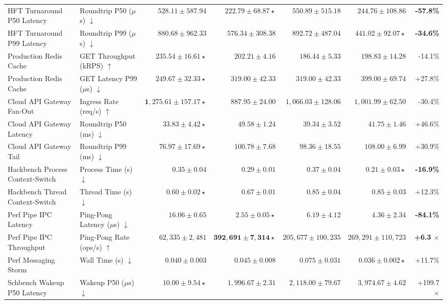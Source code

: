 \documentclass[conference]{IEEEtran}
\begin{document}
\begin{table}[t!]
{\begin{tabular}{llrrrrr}
HFT Turnaround P50 Latency & Roundtrip P50 ($\mu$s) $\downarrow$ & $528.11 \pm 587.94$ & $\mathbf{222.79 \pm 68.87} \star$ & $550.89 \pm 515.18$ & $244.76 \pm 108.86$ & \textbf{-57.8\%} \\
HFT Turnaround P99 Latency & Roundtrip P99 ($\mu$s) $\downarrow$ & $880.68 \pm 962.33$ & $576.34 \pm 308.38$ & $892.72 \pm 487.04$ & $\mathbf{441.02 \pm 92.07} \star$ & \textbf{-34.6\%} \\
Production Redis Cache & GET Throughput (kRPS) $\uparrow$ & $\mathbf{235.54 \pm 16.61} \star$ & $202.21 \pm 4.16$ & $186.44 \pm 5.33$ & $198.83 \pm 14.28$ & -14.1\% \\
Production Redis Cache & GET Latency P99 ($\mu$s) $\downarrow$ & $\mathbf{249.67 \pm 32.33} \star$ & $319.00 \pm 42.33$ & $319.00 \pm 42.33$ & $399.00 \pm 69.74$ & +27.8\% \\
Cloud API Gateway Fan-Out & Ingress Rate (req/s) $\uparrow$ & $\mathbf{1{,}275.61 \pm 157.17} \star$ & $887.95 \pm 24.00$ & $1{,}066.03 \pm 128.06$ & $1{,}001.99 \pm 62.50$ & -30.4\% \\
Cloud API Gateway Latency & Roundtrip P50 (ms) $\downarrow$ & $\mathbf{33.83 \pm 4.42} \star$ & $49.58 \pm 1.24$ & $39.34 \pm 3.52$ & $41.75 \pm 1.46$ & +46.6\% \\
Cloud API Gateway Tail & Roundtrip P99 (ms) $\downarrow$ & $\mathbf{76.97 \pm 17.69} \star$ & $100.78 \pm 7.68$ & $98.36 \pm 18.55$ & $108.00 \pm 6.99$ & +30.9\% \\
Hackbench Process Context-Switch & Process Time (s) $\downarrow$ & $0.35 \pm 0.04$ & $0.29 \pm 0.01$ & $0.37 \pm 0.04$ & $\mathbf{0.21 \pm 0.03} \star$ & \textbf{-16.9\%} \\
Hackbench Thread Context-Switch & Thread Time (s) $\downarrow$ & $\mathbf{0.60 \pm 0.02} \star$ & $0.67 \pm 0.01$ & $0.85 \pm 0.04$ & $0.85 \pm 0.03$ & +12.3\% \\
Perf Pipe IPC Latency & Ping-Pong Latency ($\mu$s) $\downarrow$ & $16.06 \pm 0.65$ & $\mathbf{2.55 \pm 0.05} \star$ & $6.19 \pm 4.12$ & $4.36 \pm 2.34$ & \textbf{-84.1\%} \\
Perf Pipe IPC Throughput & Ping-Pong Rate (ops/s) $\uparrow$ & $62{,}335 \pm 2{,}481$ & $\mathbf{392{,}691 \pm 7{,}314} \star$ & $205{,}677 \pm 100{,}235$ & $269{,}291 \pm 110{,}723$ & \textbf{+6.3 $\times$} \\
Perf Messaging Storm & Wall Time (s) $\downarrow$ & $0.040 \pm 0.003$ & $0.045 \pm 0.008$ & $0.075 \pm 0.031$ & $\mathbf{0.036 \pm 0.002} \star$ & +11.7\% \\
Schbench Wakeup P50 Latency & Wakeup P50 ($\mu$s) $\downarrow$ & $\mathbf{10.00 \pm 9.54} \star$ & $1{,}996.67 \pm 2.31$ & $2{,}118.00 \pm 79.67$ & $3{,}974.67 \pm 4.62$ & +199.7 $\times$ \\

\end{tabular}}
\end{table}
\end{document}
